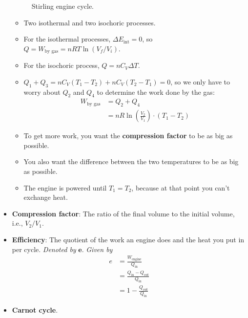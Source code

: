 \documentclass[../notes.tex]{subfiles}
\begin{document}
\begin{itemize}
\begin{figure}[h!]
        \caption{Stirling engine cycle.}
        \label{fig:stirlingCycle}
    \end{figure}
    \begin{itemize}
        \item Two isothermal and two isochoric processes.
        \item For the isothermal processes, $\Delta E_\text{int}=0$, so $Q=W_\text{by gas}=nRT\ln(V_f/V_i)$.
        \item For the isochoric process, $Q=nC_V\Delta T$.
        \item $Q_1+Q_3=nC_V(T_1-T_2)+nC_V(T_2-T_1)=0$, so we only have to worry about $Q_2$ and $Q_4$ to determine the work done by the gas:
        \begin{align*}
            W_\text{by gas} &= Q_2+Q_4\\
            &= nR\ln\left( \frac{V_2}{V_1} \right)\cdot(T_1-T_2)
        \end{align*}
        \item To get more work, you want the \textbf{compression factor} to be as big as possible.
        \item You also want the difference between the two temperatures to be as big as possible.
        \item The engine is powered until $T_1=T_2$, because at that point you can't exchange heat.
    \end{itemize}
    \item \textbf{Compression factor}: The ratio of the final volume to the initial volume, i.e., $V_2/V_1$.
    \item \textbf{Efficiency}: The quotient of the work an engine does and the heat you put in per cycle. \emph{Denoted by} $\bm{e}$. \emph{Given by}
    \begin{align*}
        e &= \frac{W_\text{engine}}{Q_\text{in}}\\
        &= \frac{Q_\text{in}-Q_\text{out}}{Q_\text{in}}\\
        &= 1-\frac{Q_\text{out}}{Q_\text{in}}
    \end{align*}
    \item \textbf{Carnot cycle}.
    \begin{figure}[h!]
        \centering
\end{figure}
\end{itemize}
\end{document}
